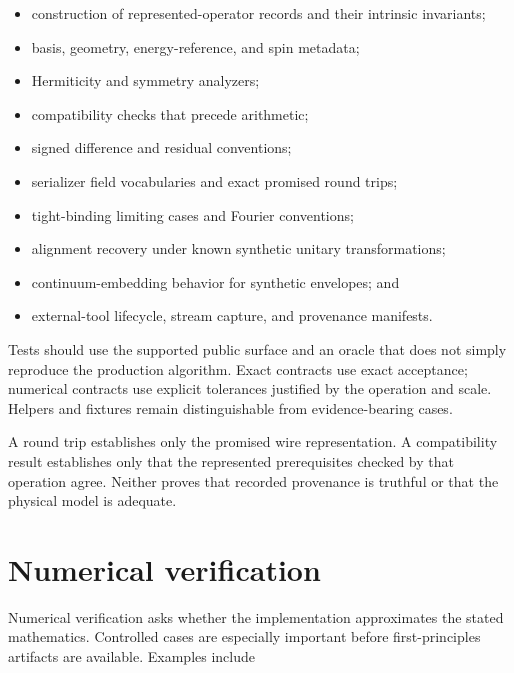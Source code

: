 \begin{itemize}
  \item construction of represented-operator records and their intrinsic
    invariants;
  \item basis, geometry, energy-reference, and spin metadata;
  \item Hermiticity and symmetry analyzers;
  \item compatibility checks that precede arithmetic;
  \item signed difference and residual conventions;
  \item serializer field vocabularies and exact promised round trips;
  \item tight-binding limiting cases and Fourier conventions;
  \item alignment recovery under known synthetic unitary transformations;
  \item continuum-embedding behavior for synthetic envelopes; and
  \item external-tool lifecycle, stream capture, and provenance manifests.
\end{itemize}

Tests should use the supported public surface and an oracle that does not simply
reproduce the production algorithm. Exact contracts use exact acceptance;
numerical contracts use explicit tolerances justified by the operation and
scale. Helpers and fixtures remain distinguishable from evidence-bearing cases.

A round trip establishes only the promised wire representation. A compatibility
result establishes only that the represented prerequisites checked by that
operation agree. Neither proves that recorded provenance is truthful or that the
physical model is adequate.

\section{Numerical verification}

Numerical verification asks whether the implementation approximates the stated
mathematics. Controlled cases are especially important before first-principles
artifacts are available. Examples include

